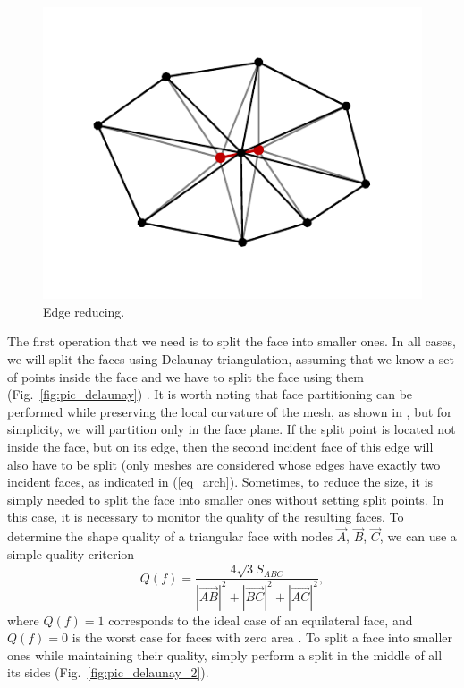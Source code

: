 \begin{figure}[h]
\centering
\includegraphics[width=\textwidth]{pics/text_1_int/pic_reduce_edge.pdf}
\caption{Edge reducing.}\label{fig:pic_reduce_edge}
\end{figure}

The first operation that we need is to split the face into smaller ones.
In all cases, we will split the faces using Delaunay triangulation, assuming that we know a set of points inside the face and we have to split the face using them (Fig.~\ref{fig:pic_delaunay}) \cite{Rivara}.
It is worth noting that face partitioning can be performed while preserving the local curvature of the mesh, as shown in \cite{Rakotoarivelo}, but for simplicity, we will partition only in the face plane.
If the split point is located not inside the face, but on its edge, then the second incident face of this edge will also have to be split (only meshes are considered whose edges have exactly two incident faces, as indicated in (\ref{eq_arch}).
Sometimes, to reduce the size, it is simply needed to split the face into smaller ones without setting split points.
In this case, it is necessary to monitor the quality of the resulting faces.
To determine the shape quality of a triangular face with nodes
$\vec{A}$, $\vec{B}$, $\vec{C}$, we can use a simple quality
criterion
\begin{equation*}
Q(f) = \frac{4\sqrt{3} S_{ABC}}{|\vec{AB}|^2 + |\vec{BC}|^2 +
|\vec{AC}|^2},
\end{equation*}
where $Q(f) = 1$ corresponds to the ideal case of an equilateral
face, and $Q(f) = 0$ is the worst case for faces with zero area
\cite{Borouchaki}.
To split a face into smaller ones while maintaining their quality, simply perform a split in the middle of all its sides (Fig.~\ref{fig:pic_delaunay_2}).

